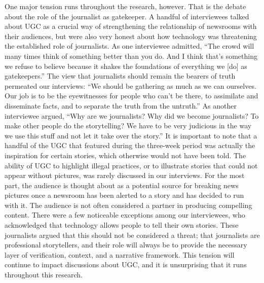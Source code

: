 \documentclass[symmetric, notoc, nobib]{towcenter-book}
\begin{document}
One major tension runs throughout the research, however. That is the
debate about the role of the journalist as gatekeeper. A handful of interviewees
talked about UGC as a crucial way of strengthening the relationship
of newsrooms with their audiences, but were also very honest about
how technology was threatening the established role of journalists. As one
interviewee admitted, ``The crowd will many times think of something better
than you do. And I think that's something we refuse to believe because it
shakes the foundations of everything we [do] as gatekeepers.''
The view that journalists should remain the bearers of truth permeated our
interviews: ``We should be gathering as much as we can ourselves. Our job
is to be the eyewitnesses for people who can't be there, to assimilate and
disseminate facts, and to separate the truth from the untruth.''
As another interviewee argued, ``Why are we journalists? Why did we
become journalists? To make other people do the storytelling? We have
to be very judicious in the way we use this stuff and not let it take over
the story.''
It is important to note that a handful of the UGC that featured during the
three-week period was actually the inspiration for certain stories, which
otherwise would not have been told. The ability of UGC to highlight illegal
practices, or to illustrate stories that could not appear without pictures, was
rarely discussed in our interviews.
For the most part, the audience is thought about as a potential source for
breaking news pictures once a newsroom has been alerted to a story and
has decided to run with it. The audience is not often considered a partner
in producing compelling content. There were a few noticeable exceptions
among our interviewees, who acknowledged that technology allows people
to tell their own stories. These journalists argued that this should not be
considered a threat; that journalists are professional storytellers, and their
role will always be to provide the necessary layer of verification, context,
and a narrative framework. This tension will continue to impact discussions
about UGC, and it is unsurprising that it runs throughout this research.
\end{document}
